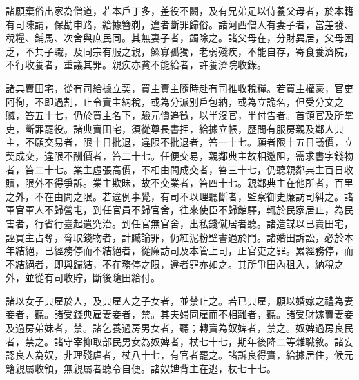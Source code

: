 \begin{pinyinscope}
 諸願棄俗出家為僧道，若本戶丁多，差役不闕，及有兄弟足以侍養父母者，於本籍有司陳請，保勘申路，給據簪剃，違者斷罪歸俗。諸河西僧人有妻子者，當差發、稅糧、鋪馬、次舍與庶民同。其無妻子者，蠲除之。諸父母在，分財異居，父母困乏，不共子職，及同宗有服之親，鰥寡孤獨，老弱殘疾，不能自存，寄食養濟院，不行收養者，重議其罪。親疾亦貧不能給者，許養濟院收錄。



 諸典賣田宅，從有司給據立契，買主賣主隨時赴有司推收稅糧。若買主權豪，官吏阿徇，不即過割，止令賣主納稅，或為分派別戶包納，或為立詭名，但受分文之贓，笞五十七，仍於買主名下，驗元價追徵，以半沒官，半付告者。首領官及所掌吏，斷罪罷役。諸典賣田宅，須從尊長書押，給據立帳，歷問有服房親及鄰人典主，不願交易者，限十日批退，違限不批退者，笞一十七。願者限十五日議價，立契成交，違限不酬價者，笞二十七。任便交易，親鄰典主故相邀阻，需求書字錢物者，笞二十七。業主虛張高價，不相由問成交者，笞三十七，仍聽親鄰典主百日收贖，限外不得爭訴。業主欺昧，故不交業者，笞四十七。親鄰典主在他所者，百里之外，不在由問之限。若違例事覺，有司不以理聽斷者，監察御史廉訪司糾之。諸軍官軍人不歸營屯，到任官員不歸官舍，往來使臣不歸館驛，輒於民家居止，為民害者，行省行臺起遣究治。到任官無官舍，出私錢僦居者聽。諸造謀以已賣田宅，誣買主占奪，脅取錢物者，計贓論罪，仍紅泥粉壁書過於門。諸婚田訴訟，必於本年結絕，已經務停而不結絕者，從廉訪司及本管上司，正官吏之罪。累經務停，而不結絕者，即與歸結，不在務停之限，違者罪亦如之。其所爭田內租入，納稅之外，並從有司收貯，斷後隨田給付。



 諸以女子典雇於人，及典雇人之子女者，並禁止之。若已典雇，願以婚嫁之禮為妻妾者，聽。諸受錢典雇妻妾者，禁。其夫婦同雇而不相離者，聽。諸受財嫁賣妻妾及過房弟妹者，禁。諸乞養過房男女者，聽；轉賣為奴婢者，禁之。奴婢過房良民者，禁之。諸守宰抑取部民男女為奴婢者，杖七十七，期年後降二等雜職敘。諸妄認良人為奴，非理殘虐者，杖八十七，有官者罷之。諸訴良得實，給據居住，候元籍親屬收領，無親屬者聽令自便。諸奴婢背主在逃，杖七十七。




\end{pinyinscope}
